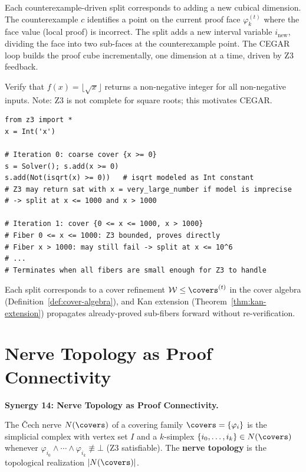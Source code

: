 \begin{proposition}
\label{prop:cegar-cubical}
Each counterexample-driven split corresponds to adding a new cubical
dimension.  The counterexample $c$ identifies a point on the current
proof face $\varphi_k^{(t)}$ where the face value (local proof) is
incorrect.  The split adds a new interval variable $i_\mathrm{new}$,
dividing the face into two sub-faces at the counterexample point.  The
CEGAR loop builds the proof cube incrementally, one dimension at a time,
driven by Z3 feedback.
\end{proposition}

\begin{example}
\label{ex:cegar-example}
Verify that $f(x) = \lfloor \sqrt{x} \rfloor$ returns a non-negative
integer for all non-negative inputs.  Note: Z3 is not complete for
square roots; this motivates CEGAR.
\begin{lstlisting}
from z3 import *
x = Int('x')

# Iteration 0: coarse cover {x >= 0}
s = Solver(); s.add(x >= 0)
s.add(Not(isqrt(x) >= 0))   # isqrt modeled as Int constant
# Z3 may return sat with x = very_large_number if model is imprecise
# -> split at x <= 1000 and x > 1000

# Iteration 1: cover {0 <= x <= 1000, x > 1000}
# Fiber 0 <= x <= 1000: Z3 bounded, proves directly
# Fiber x > 1000: may still fail -> split at x <= 10^6
# ...
# Terminates when all fibers are small enough for Z3 to handle
\end{lstlisting}
Each split corresponds to a cover refinement
$\mathcal{W} \leq \covers^{(t)}$ in the cover algebra
(Definition~\ref{def:cover-algebra}), and Kan extension
(Theorem~\ref{thm:kan-extension}) propagates already-proved sub-fibers
forward without re-verification.
\end{example}


\section{Nerve Topology as Proof Connectivity}
\label{sec:nerve-topology}

\noindent\textbf{Synergy 14: Nerve Topology as Proof Connectivity.}

\begin{definition}
\label{def:nerve-ref}
The \v{C}ech nerve $N(\covers)$ of a covering family $\covers =
\{\varphi_i\}$ is the simplicial complex with vertex set $I$ and a
$k$-simplex $\{i_0, \ldots, i_k\} \in N(\covers)$ whenever
$\varphi_{i_0} \wedge \cdots \wedge \varphi_{i_k} \not\equiv \bot$
(Z3 satisfiable).  The \textbf{nerve topology} is the topological
realization $|N(\covers)|$.
\end{definition}

